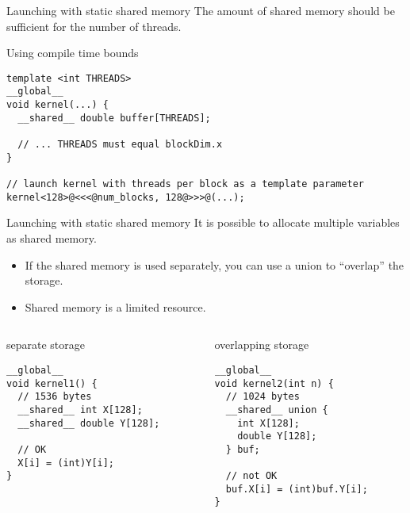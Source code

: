 \documentclass[aspectratio=43]{beamer}
\begin{document}
\begin{frame}[fragile]{Launching with static shared memory}
    The amount of shared memory should be sufficient for the number of threads.

    \begin{code}{Using compile time bounds}
        \begin{lstlisting}[style=boxcudatiny]
template <int THREADS>
__global__
void kernel(...) {
  __shared__ double buffer[THREADS];

  // ... THREADS must equal blockDim.x
}

// launch kernel with threads per block as a template parameter
kernel<128>@<<<@num_blocks, 128@>>>@(...);
        \end{lstlisting}
    \end{code}
\end{frame}

\begin{frame}[fragile]{Launching with static shared memory}
    It is possible to allocate multiple variables as shared memory.
    \begin{itemize}
        \item   If the shared memory is used separately, you can use a union to ``overlap'' the storage.
        \item   Shared memory is a limited resource.
    \end{itemize}

    \begin{columns}[T]
        \begin{column}{0.48\textwidth}
            \begin{code}{separate storage}
                \begin{lstlisting}[style=boxcudatiny]
__global__
void kernel1() {
  // 1536 bytes
  __shared__ int X[128];
  __shared__ double Y[128];

  // OK
  X[i] = (int)Y[i];
}
                 \end{lstlisting}
            \end{code}
        \end{column}

        \begin{column}{0.48\textwidth}
            \begin{code}{overlapping storage}
                \begin{lstlisting}[style=boxcudatiny]
__global__
void kernel2(int n) {
  // 1024 bytes
  __shared__ union {
    int X[128];
    double Y[128];
  } buf;

  // not OK
  buf.X[i] = (int)buf.Y[i];
}
                \end{lstlisting}
            \end{code}
        \end{column}
    \end{columns}
\end{frame}
\end{document}
